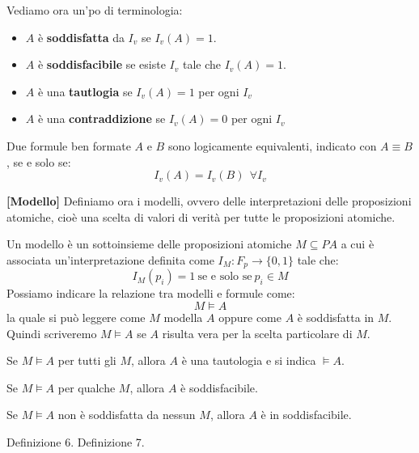 Vediamo ora un'po di terminologia:
\begin{itemize}
    \item $A$ è \textbf{soddisfatta} da $I_v$ se $I_v(A) = 1$.
    \item $A$ è \textbf{soddisfacibile} se esiste $I_v$ tale che $I_v(A) = 1$.
    \item $A$ è una \textbf{tautlogia} se $I_v(A) = 1$ per ogni $I_v$
    \item $A$ è una \textbf{contraddizione} se $I_v(A) = 0$ per ogni $I_v$
\end{itemize}
\begin{definizione}
    Due formule ben formate $A$ e $B$ sono logicamente equivalenti, indicato con
    $A \equiv B$, se e solo se:
    \begin{equation}
        I_v(A) = I_v(B) \ \ \forall I_v
    \end{equation}
\end{definizione}
\begin{definizione}\textbf{[Modello]}
    Definiamo ora i modelli, ovvero delle interpretazioni delle proposizioni
    atomiche, cioè una scelta di valori di verità per tutte le proposizioni atomiche.

    Un modello è un sottoinsieme delle proposizioni atomiche $M \subseteq PA$ a
    cui è associata un'interpretazione definita come $I_M: F_p \to \{0, 1\}$ tale che:
    \begin{equation}
        I_M(p_i) = 1 \ \text{se e solo se} \ p_i \in M
    \end{equation}
    Possiamo indicare la relazione tra modelli e formule come:
    \begin{equation}
        M \models A
    \end{equation}
    la quale si può leggere come $M$ modella $A$ oppure come $A$ è soddisfatta
    in $M$. Quindi scriveremo $M \models A$ se $A$ risulta vera per la scelta
    particolare di $M$.
\end{definizione}
\begin{definizione}
    Se $M \models A$ per tutti gli $M$, allora $A$ è una tautologia e si indica
    $\models A$.
\end{definizione}
\begin{definizione}
    Se $M \models A$ per qualche $M$, allora $A$ è soddisfacibile.
\end{definizione}
\begin{definizione}
    Se $M \models A$ non è soddisfatta da nessun $M$, allora $A$ è in soddisfacibile.
\end{definizione}
Definizione 6.
Definizione 7.
